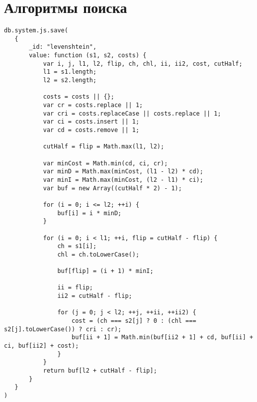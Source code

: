 \documentclass[a4paper]{article}
\begin{document}
\section{Алгоритмы поиска}
\begin{verbatim}
db.system.js.save(
   {
       _id: "levenshtein",
       value: function (s1, s2, costs) {
           var i, j, l1, l2, flip, ch, chl, ii, ii2, cost, cutHalf;
           l1 = s1.length;
           l2 = s2.length;

           costs = costs || {};
           var cr = costs.replace || 1;
           var cri = costs.replaceCase || costs.replace || 1;
           var ci = costs.insert || 1;
           var cd = costs.remove || 1;

           cutHalf = flip = Math.max(l1, l2);

           var minCost = Math.min(cd, ci, cr);
           var minD = Math.max(minCost, (l1 - l2) * cd);
           var minI = Math.max(minCost, (l2 - l1) * ci);
           var buf = new Array((cutHalf * 2) - 1);

           for (i = 0; i <= l2; ++i) {
               buf[i] = i * minD;
           }

           for (i = 0; i < l1; ++i, flip = cutHalf - flip) {
               ch = s1[i];
               chl = ch.toLowerCase();

               buf[flip] = (i + 1) * minI;

               ii = flip;
               ii2 = cutHalf - flip;

               for (j = 0; j < l2; ++j, ++ii, ++ii2) {
                   cost = (ch === s2[j] ? 0 : (chl === s2[j].toLowerCase()) ? cri : cr);
                   buf[ii + 1] = Math.min(buf[ii2 + 1] + cd, buf[ii] + ci, buf[ii2] + cost);
               }
           }
           return buf[l2 + cutHalf - flip];
       }
   }
)


\end{verbatim}
\end{document}
